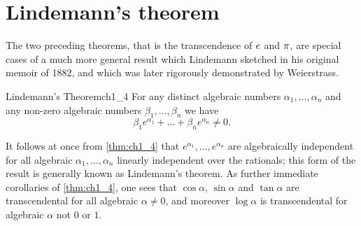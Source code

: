 \section{Lindemann's theorem}

The two preceding theorems, that is the transcendence of $e\index{transcendence of e}$ and $\pi\index{transcendence of  $\pi$}$, are special cases of a much more general result which Lindemann sketched in his original memoir of 1882, and which was later rigorously demonstrated by Weierstrass.

\begin{mythm}{Lindemann's Theorem}{ch1_4}
For any distinct algebraic numbers $\alpha_1, \dots, \alpha_n$ and any non-zero algebraic numbers $\beta_1, \dots, \beta_n$ we have
\begin{equation*} 
\beta_1 e^{\alpha_1} + \dots + \beta_n e^{\alpha_n} \neq 0.
\end{equation*}
\end{mythm}

It follows at once from \autoref{thm:ch1_4} that $e^{\alpha_1}, \dots, e^{\alpha_n}$ are algebraically independent for all algebraic $\alpha_1, \dots, \alpha_n$ linearly independent over the rationals; this form of the result is generally known as Lindemann's theorem. As further immediate corollaries of \autoref{thm:ch1_4}, one sees that $\cos \alpha$, $\sin \alpha$ and $\tan \alpha$ are transcendental for all algebraic $\alpha \neq 0$, and moreover $\log \alpha$ is transcendental for algebraic $\alpha$ not $0$ or $1$.


